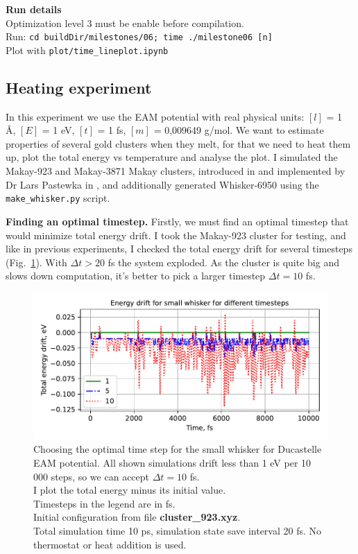 \documentclass[12pt,a4paper]{article}
\begin{document}
{\bf Run details}\\
Optimization level 3 must be enable before compilation.\\
Run: \verb|cd buildDir/milestones/06; time ./milestone06 [n]|\\
Plot with \verb|plot/time_lineplot.ipynb|

\subsection*{Heating experiment}

In this experiment we use the EAM potential with real physical units: $[l]$ = 1 Å, $[E]$ = 1 eV, $[t]$ = 1 fs, $[m]$ = 0,009649 g/mol. We want to estimate properties of several gold clusters when they melt, for that we need to heat them up, plot the total energy vs temperature and analyse the plot. I simulated the Makay-923 and Makay-3871 Makay clusters, introduced in \cite{MakayOriginal} and implemented by Dr Lars Pastewka in \cite{MakayPastewka}, and additionally generated Whisker-6950 using the \verb|make_whisker.py| script.

{\bf Finding an optimal timestep.} Firstly, we must find an optimal timestep that would minimize total energy drift. I took the Makay-923 cluster for testing, and like in previous experiments, I checked the total energy drift for several timesteps (Fig.~\ref{fig:total_energy_07}). With $\Delta t > 20$ fs the system exploded. As the cluster is quite big and slows down computation, it's better to pick a larger timestep $\Delta t = 10$ fs.

\begin{figure}[htb]
	\centering
	\includegraphics[width=.9\linewidth]{img/milestone07-energy.pdf}
	\caption{Choosing the optimal time step for the small whisker for Ducastelle EAM potential. All shown simulations drift less than 1 eV per 10 000 steps, so we can accept $\Delta t = 10$ fs.\\
		I plot the total energy minus its initial value.\\
		Timesteps in the legend are in fs.\\
		Initial configuration from file {\bf cluster\_923.xyz}.\\
		Total simulation time 10 ps, simulation state save interval 20 fs.
		No thermostat or heat addition is used.}
	\label{fig:total_energy_07}
\end{figure}
\end{document}
